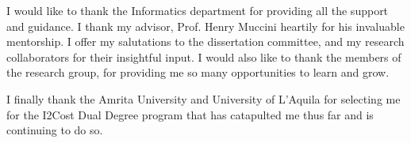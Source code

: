 I would like to thank the Informatics department for providing all the support and guidance. I thank my advisor, Prof. Henry Muccini heartily for his invaluable mentorship. I offer my salutations to the dissertation committee, and my research collaborators for their insightful input. I would also like to thank the members of the research group, for providing me so many opportunities to learn and grow. 

I finally thank the Amrita University and University of L'Aquila for selecting me for the I2Cost Dual Degree program that has catapulted me thus far and is continuing to do so. 